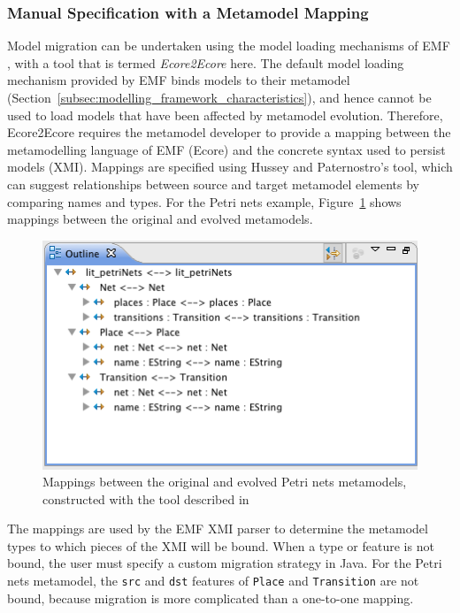 \subsubsection{Manual Specification with a Metamodel Mapping}
\label{subsubsec:ecore2ecore}
Model migration can be undertaken using the model loading mechanisms of EMF \cite{hussey06advanced}, with a tool that is termed \emph{Ecore2Ecore} here. The default model loading mechanism provided by EMF binds models to their metamodel (Section~\ref{subsec:modelling_framework_characteristics}), and hence cannot be used to load models that have been affected by metamodel evolution. Therefore, Ecore2Ecore requires the metamodel developer to provide a mapping between the metamodelling language of EMF (Ecore) and the concrete syntax used to persist models (XMI). Mappings are specified using Hussey and Paternostro's tool, which can suggest relationships between source and target metamodel elements by comparing names and types. For the Petri nets example, Figure~\ref{fig:petri_nets_ecore2ecore} shows mappings between the original and evolved metamodels.

\begin{figure}[htb]
	\centering
		\includegraphics[scale=0.75]{5.Implementation/images/petri_nets_ecore2ecore.png}
	\caption[Mappings between the original and evolved Petri nets metamodels]{Mappings between the original and evolved Petri nets metamodels, constructed with the tool described in \cite{hussey06advanced}}
	\label{fig:petri_nets_ecore2ecore}
\end{figure}


The mappings are used by the EMF XMI parser to determine the metamodel types to which pieces of the XMI will be bound. When a type or feature is not bound, the user must specify a custom migration strategy in Java. For the Petri nets metamodel, the \texttt{src} and \texttt{dst} features of \texttt{Place} and \texttt{Transition} are not bound, because migration is more complicated than a one-to-one mapping.


